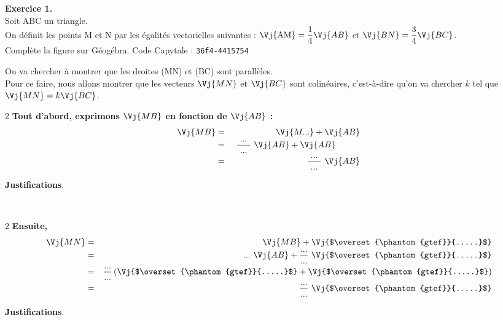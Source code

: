 \documentclass[a4paper,10pt,french]{article}
\begin{document}
\pagestyle{empty}


\textbf{{\large Exercice 1.}}\\
\I Soit ABC un triangle.\\
On définit les points M et N par les égalités vectorielles suivantes : $\Vj{\text{AM}}=\dfrac14\Vj{AB}$ et $\Vj{BN}=\dfrac34 \Vj{BC}$.\\

Complète la figure sur Géogébra. Code Capytale : \texttt{36f4-4415754}


On va chercher à montrer que les droites (MN) et (BC) sont parallèles.\\
Pour ce faire, nous allons montrer que les vecteurs $\Vj{MN}$ et $\Vj{BC}$ sont colinéaires, c'est-à-dire qu'on va chercher $k$ tel que $\Vj{MN}=k\Vj{BC}$.

\begin{multicols}{2}
\textbf{Tout d'abord, exprimons $\Vj{MB}$ en fonction de $\Vj{AB}$ : }
 \begin{eqnarray*}
\Vj{MB} & = & \Vj{M...} + \Vj{AB} \\
 &=&  \ \dfrac{\ ...\ }{\ ...\ } \ \Vj {AB} + \Vj {AB} \hspace*{1cm} \\ 
  &=&  \ \dfrac{\ ...\ }{\ ...\ } \ \Vj {AB} 
\end{eqnarray*}

\begin{center}
\textbf{Justifications}.
\end{center}
\phantom{.} \dotfill

\medskip

\phantom{.} \dotfill

\medskip

\phantom{.} \dotfill\\
\end{multicols}

\begin{multicols}{2}
\textbf{Ensuite, }
 \begin{eqnarray*}
\Vj{MN} & = & \Vj{MB} + \Vj{$\overset{\phantom{gtef}}{.....}$} \\
 &=& ... \ \Vj{AB} + \dfrac{...}{...}\ \Vj{$\overset{\phantom{gtef}}{.....}$}\\
  &=& \dfrac{...}{...} \left( \Vj{$\overset{\phantom{gtef}}{.....}$} + \Vj{$\overset{\phantom{gtef}}{.....}$} \right)\\
    &=& \ \dfrac{...}{...} \ \Vj{$\overset{\phantom{gtef}}{.....}$}
\end{eqnarray*}


\begin{center}
\textbf{Justifications}.
\end{center}
\phantom{.} \dotfill

\medskip

\phantom{.} \dotfill

\bigskip

\phantom{.} \dotfill


\bigskip

\phantom{.} \dotfill
\\
\end{multicols}
\end{document}

